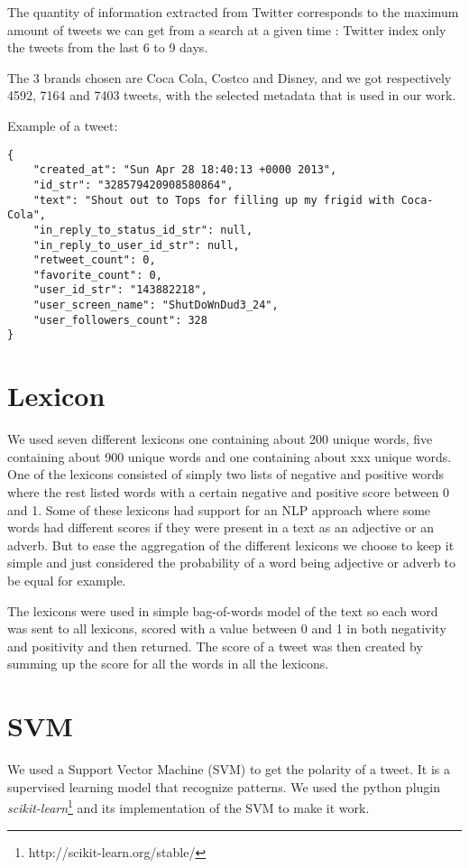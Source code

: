 \documentclass[a4paper,12pt]{report}
\begin{document}
The quantity of information extracted from Twitter corresponds to the maximum amount of tweets we can get from a search at a given time : Twitter index only the tweets from the last 6 to 9 days.

The 3 brands chosen are Coca Cola, Costco and Disney, and we got respectively 4592, 7164 and 7403 tweets, with the selected metadata that is used in our work.

Example of a tweet:

\begin{verbatim}
{
    "created_at": "Sun Apr 28 18:40:13 +0000 2013",
    "id_str": "328579420908580864",
    "text": "Shout out to Tops for filling up my frigid with Coca-Cola",
    "in_reply_to_status_id_str": null,
    "in_reply_to_user_id_str": null, 
    "retweet_count": 0,
    "favorite_count": 0,
    "user_id_str": "143882218",
    "user_screen_name": "ShutDoWnDud3_24",
    "user_followers_count": 328
}
\end{verbatim}

\section{Lexicon}
We used seven different lexicons one containing about 200 unique words, five containing about 900 unique words and one containing about xxx unique words.
One of the lexicons consisted of simply two lists of negative and positive words where the rest listed words with a certain negative and positive score between 0 and 1. 
Some of these lexicons had support for an NLP approach where some words had different scores if they were present in a text as an adjective or an adverb.  
But to ease the aggregation of the different lexicons we choose to keep it simple and just considered the probability of a word being adjective or adverb to be equal for example.

The lexicons were used in simple bag-of-words model of the text so each word was sent to all lexicons, scored with a value between 0 and 1 in both negativity and positivity and then returned. 
The score of a tweet was then created by summing up the score for all the words in all the lexicons. 

\section{SVM}
We used a Support Vector Machine (SVM) to get the polarity of a tweet. It is a supervised learning model that recognize patterns. We used the python plugin \textit{scikit-learn}\footnote{http://scikit-learn.org/stable/} and its implementation of the SVM to make it work.
\end{document}
